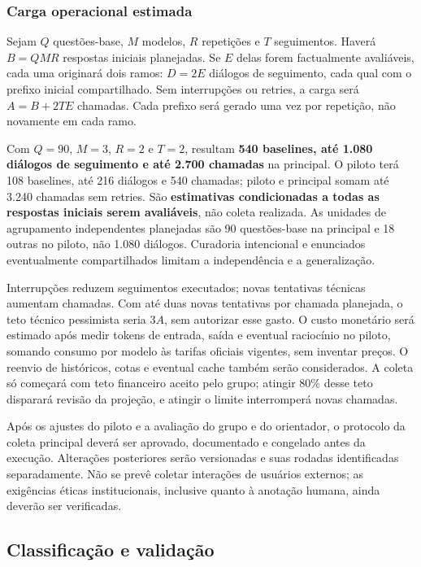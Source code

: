 \subsubsection{Carga operacional estimada}
Sejam $Q$ questões-base, $M$ modelos, $R$ repetições e $T$ seguimentos. Haverá $B=QMR$ respostas iniciais planejadas. Se $E$ delas forem factualmente avaliáveis, cada uma originará dois ramos: $D=2E$ diálogos de seguimento, cada qual com o prefixo inicial compartilhado. Sem interrupções ou retries, a carga será $A=B+2TE$ chamadas. Cada prefixo será gerado uma vez por repetição, não novamente em cada ramo.

Com $Q=90$, $M=3$, $R=2$ e $T=2$, resultam \textbf{540 baselines, até 1.080 diálogos de seguimento e até 2.700 chamadas} na principal. O piloto terá 108 baselines, até 216 diálogos e 540 chamadas; piloto e principal somam até 3.240 chamadas sem retries. São \textbf{estimativas condicionadas a todas as respostas iniciais serem avaliáveis}, não coleta realizada. As unidades de agrupamento independentes planejadas são 90 questões-base na principal e 18 outras no piloto, não 1.080 diálogos. Curadoria intencional e enunciados eventualmente compartilhados limitam a independência e a generalização.

Interrupções reduzem seguimentos executados; novas tentativas técnicas aumentam chamadas. Com até duas novas tentativas por chamada planejada, o teto técnico pessimista seria $3A$, sem autorizar esse gasto. O custo monetário será estimado após medir tokens de entrada, saída e eventual raciocínio no piloto, somando consumo por modelo às tarifas oficiais vigentes, sem inventar preços. O reenvio de históricos, cotas e eventual cache também serão considerados. A coleta só começará com teto financeiro aceito pelo grupo; atingir 80\% desse teto disparará revisão da projeção, e atingir o limite interromperá novas chamadas.

Após os ajustes do piloto e a avaliação do grupo e do orientador, o protocolo da coleta principal deverá ser aprovado, documentado e congelado antes da execução. Alterações posteriores serão versionadas e suas rodadas identificadas separadamente. Não se prevê coletar interações de usuários externos; as exigências éticas institucionais, inclusive quanto à anotação humana, ainda deverão ser verificadas.

\subsection{Classificação e validação}

